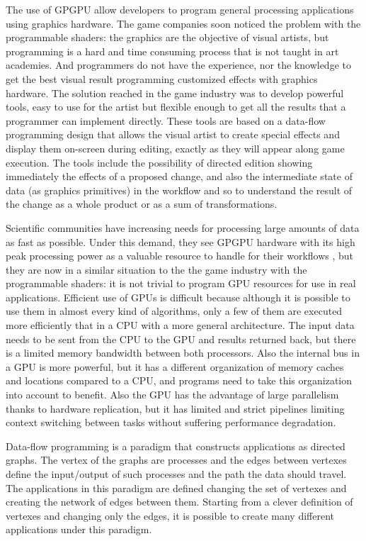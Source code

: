 \documentclass[conference]{IEEEtran}
\begin{document}
The use of GPGPU allow developers to program general processing applications
using graphics hardware. The game companies soon noticed the problem with the
programmable shaders: the graphics are the objective of visual artists, but
programming is a hard and time consuming process that is not taught in art
academies.  And programmers do not have the experience, nor the knowledge to get
the best visual result programming customized effects with graphics hardware.
The solution reached in the game industry was to develop powerful tools, easy to
use for the artist but flexible enough to get all the results that a programmer
can implement directly.  These tools are based on a data-flow programming design
that allows the visual artist to create special effects and display them
on-screen during editing, exactly as they will appear along game execution.  The
tools include the possibility of directed edition showing immediately the
effects of a proposed change, and also the intermediate state of data (as
graphics primitives) in the workflow and so to understand the result of the
change as a whole product or as a sum of transformations.



Scientific communities have increasing needs for processing large amounts of
data as fast as possible\cite{DataDeluge}.  Under this demand, they see GPGPU
hardware with its high peak processing power as a valuable resource to handle
for their workflows \cite{Fan:2004:GCH:1048933.1049991}, but they are now in a
similar situation to the the game industry with the programmable shaders: it is
not trivial to program GPU resources for use in real applications.  Efficient
use of GPUs is difficult because although it is possible to use them in almost
every kind of algorithms, only a few of them are executed more efficiently that
in a CPU with a more general architecture.  The input data needs to be sent from
the CPU to the GPU and results returned back, but there is a limited memory
bandwidth between both processors.  Also the internal bus in a GPU is more
powerful, but it has a different organization of memory caches and locations
compared to a CPU, and programs need to take this organization into account to
benefit.  Also the GPU has the advantage of large parallelism thanks to hardware
replication, but it has limited and strict pipelines limiting context switching
between tasks without suffering performance degradation.



Data-flow programming is a paradigm that constructs applications as directed
graphs\cite{Arvind:1986:DA:17814.17824}\cite{DBLP:journals/computer/DavisK82}.
The vertex of the graphs are processes and the edges between vertexes define the
input/output of such processes and the path the data should travel.  The
applications in this paradigm are defined changing the set of vertexes and
creating the network of edges between them.  Starting from a clever definition
of vertexes and changing only the edges, it is possible to create many different
applications under this paradigm.
\end{document}

